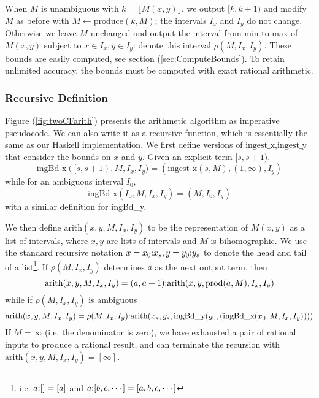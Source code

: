 \documentclass[11pt, oneside]{amsart}   	%
\renewcommand{\:}{\negthickspace:\negthickspace}
\begin{document}
When $M$ is unambiguous with $k = \lfloor M(x,y) \rfloor$, we output $[k,k+1)$ and modify $M$ as before with $M \leftarrow \mbox{produce}(k,M)$;
the intervals $I_x$ and $I_y$ do not change. Otherwise we leave $M$ unchanged and output the interval from min to max of $M(x,y)$ subject to $x \in I_x, y \in I_y$:
denote this interval $\rho\left(M, I_x, I_y\right)$.
These bounds are easily computed, see section (\ref{sec:ComputeBounds}).
To retain unlimited accuracy, the bounds must be computed with exact rational arithmetic.


\subsubsection{Recursive Definition}
Figure (\ref{fig:twoCFarith}) presents the arithmetic algorithm as imperative pseudocode. We can also write it as a recursive function,
which is essentially the same as our Haskell implementation.
We first define versions of $\mbox{ingest\_x},\mbox{ingest\_y}$ that consider the bounds on $x$ and $y$. Given an explicit term $[s,s+1)$,
\[
\mbox{ingBd\_x}([s,s+1), M, I_x, I_y) = 
(\mbox{ingest\_x}(s,M), (1,\infty),I_y)
\]
while for an ambiguous interval $I_0$,
\[
\mbox{ingBd\_x}(I_0, M, I_x, I_y) = 
(M, I_0,I_y)
\]
with a similar definition for \mbox{ingBd\_y}.

We then define
$\mbox{arith}(x,y, M, I_x, I_y)$
to be the representation of $M(x,y)$ as a list of intervals, where $x,y$ are lists of intervals and $M$ is bihomographic. We use the standard recursive notation $x = x_0\:x_s, y = y_0\:y_s$ to denote the head and tail of a list\footnote{i.e. $a\:[] = [a]$ and $a\:[b,c,\cdots] = [a,b,c,\cdots]$}.  If $\rho(M,I_x,I_y)$ determines $a$ as the next output term, then
\[
\mbox{arith}(x,y, M, I_x, I_y) = (a,a+1)\:\mbox{arith}(x,y,  \mbox{prod}(a,M) ,  I_x,  I_y)
\]
while if $\rho(M,I_x,I_y)$ is ambiguous
\[
\mbox{arith}(x,y, M, I_x, I_y) = \rho(M,I_x,I_y)\:\mbox{arith}(x_s,y_s,  \mbox{ingBd\_y}( y_0, (\mbox{ingBd\_x}(x_0,M,I_x,I_y)) ))
\]
If $M=\infty$ (i.e. the denominator is zero), we have exhausted a pair of rational inputs to produce a rational result, and can terminate the recursion with $\mbox{arith}(x,y, M, I_x, I_y) = [\infty]$.

\end{document}
